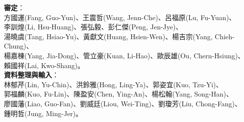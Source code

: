 \begin{Kai}
\noindent \textbf{審定}：\\
方國運(Fang, Guo-Yun)、王震哲(Wang, Jenn-Che)、呂福原(Lu, Fu-Yuan)、\\
李訓煌(Li, Hsu-Huang)、張弘毅、彭仁傑(Peng, Jen-Jye)、\\
湯曉虞(Tang, Hsiao-Yu)、黃獻文(Huang, Hsien-Wen)、楊吉宗(Yang, Chieh-Chung)、\\
楊嘉棟(Yang, Jia-Dong)、管立豪(Kuan, Li-Hao)、歐辰雄(Ou, Chern-Hsiung)、\\
賴國祥(Lai, Kwo-Shang)。 \\

\noindent \textbf{資料整理與輸入}：\\
林郁芹(Lin, Yu-Chin)、洪鈴雅(Hong, Ling-Ya)、郭姿宜(Kuo, Tzu-Yi)、\\
郭福麟(Kuo, Fu-Lin)、陳盈安(Chen, Ying-An)、楊松翰(Yang, Song-Han)、\\
廖國藩(Liao, Guo-Fan)、劉威廷(Liou, Wei-Ting)、劉瓊芳(Liu, Chong-Fang)、\\
鍾明哲(Jung, Ming-Jer)。
\end{Kai}

\linespread{1}\selectfont
